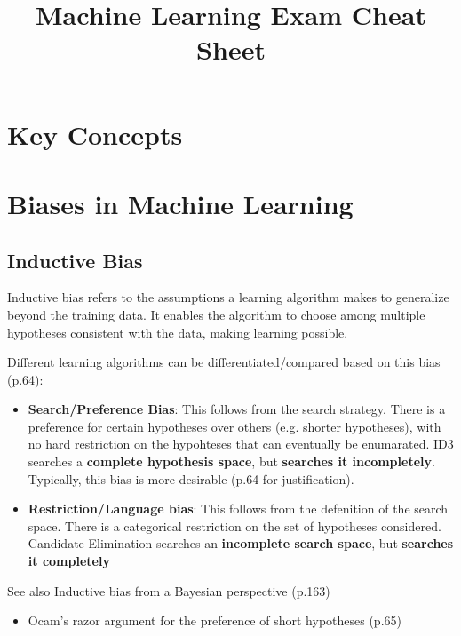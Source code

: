 \documentclass[10pt,a4paper]{article}
\title{Machine Learning Exam Cheat Sheet}
\author{}
\date{}
\begin{document}
\maketitle

\section*{Key Concepts}
\section*{Biases in Machine Learning}

\subsection*{Inductive Bias}
Inductive bias refers to the assumptions a learning algorithm makes to generalize beyond the training data. It enables the algorithm to choose among multiple hypotheses consistent with the data, making learning possible. 

Different learning algorithms can be differentiated/compared based on this bias (p.64):

\begin{itemize}
	\item \textbf{Search/Preference Bias}: This follows from the search strategy. There is a preference for certain hypotheses over others (e.g. shorter hypotheses), with no hard restriction on the hypohteses that can eventually be enumarated. ID3 searches a \textbf{complete hypothesis space}, but  \textbf{searches it incompletely}. Typically, this bias is more desirable (p.64 for justification). 
	
	\item \textbf{Restriction/Language bias}: This follows from the defenition of the search space. There is a categorical restriction on the set of hypotheses considered. Candidate Elimination searches an \textbf{incomplete search space}, but \textbf{searches it completely} 
\end{itemize}

See also Inductive bias from a Bayesian perspective (p.163)
\begin{itemize}
	\item Ocam's razor argument for the preference of short hypotheses (p.65)
\end{itemize}


\end{document}
